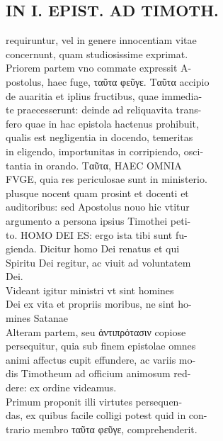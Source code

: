 \documentclass{article}
\begin{document}
\begin{pages}
\section*{IN I. EPIST. AD TIMOTH. \\
                }
requiruntur, vel in genere innocentiam vitae \\
                concernunt, quam studiosissime exprimat. \\
                Priorem partem vno commate expressit A- \\
                postolus, haec fuge, ταῦτα φεῦγε. Ταῦτα accipio \\
                de auaritia et iplius fructibus, quae immedia- \\
                te praecesserunt: deinde ad reliquavita trans- \\
                fero quae in hac epistola hactenus prohibuit, \\
                qualis est negligentia in docendo, temeritas \\
                in eligendo, importunitas in corripiendo, osci- \\
                tantia in orando. Ταῦτα, HAEC OMNIA \\
                FVGE, quia res periculosae sunt in ministerio. \\
                plusque nocent quam prosint et docenti et \\
                auditoribus: sed Apostolus nouo hic vtitur \\
                argumento a persona ipsius Timothei peti- \\
                to. HOMO DEI ES: ergo ista tibi sunt fu- \\
                gienda. Dicitur homo Dei renatus et qui \\
                Spiritu Dei regitur, ac viuit ad voluntatem \\
                Dei. \\
                Videant igitur ministri vt sint homines \\
                Dei ex vita et propriis moribus, ne sint ho- \\
                mines Satanae \\
                Alteram partem, seu ἀντιπρότασιν copiose \\
                persequitur, quia sub finem epistolae omnes \\
                animi affectus cupit effundere, ac variis mo- \\
                dis Timotheum ad officium animosum red- \\
                dere: ex ordine videamus. \\
                Primum proponit illi virtutes persequen- \\
                das, ex quibus facile colligi potest quid in con- \\
                trario membro ταῦτα φεῦγε, comprehenderit. \\
                

\end{pages}
\end{document}
